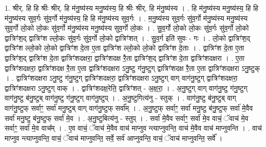 \documentclass[17pt]{extarticle}
\begin{document}
1. श्रीर्. हि हि श्रीः श्रीर्. हि म॑नु॒ष्य॑स्य मनु॒ष्य॑स्य॒ हि श्रीः श्रीर्. हि म॑नु॒ष्य॑स्य । . हि म॑नु॒ष्य॑स्य मनु॒ष्य॑स्य॒ हि हि म॑नु॒ष्य॑स्य सुव॒र्गः सु॑व॒र्गो म॑नु॒ष्य॑स्य॒ हि हि म॑नु॒ष्य॑स्य सुव॒र्गः । . म॒नु॒ष्य॑स्य सुव॒र्गः सु॑व॒र्गो म॑नु॒ष्य॑स्य मनु॒ष्य॑स्य सुव॒र्गो लो॒को लो॒कः सु॑व॒र्गो म॑नु॒ष्य॑स्य मनु॒ष्य॑स्य सुव॒र्गो लो॒कः । . सु॒व॒र्गो लो॒को लो॒कः सु॑व॒र्गः सु॑व॒र्गो लो॒को द्वात्रिꣳ॑श॒द् द्वात्रिꣳ॑श ल्लो॒कः सु॑व॒र्गः सु॑व॒र्गो लो॒को द्वात्रिꣳ॑शत् । . सु॒व॒र्ग इति॑ सुवः - गः । . लो॒को द्वात्रिꣳ॑श॒द् द्वात्रिꣳ॑श ल्लो॒को लो॒को द्वात्रिꣳ॑श दे॒ता ए॒ता द्वात्रिꣳ॑श ल्लो॒को लो॒को द्वात्रिꣳ॑श दे॒ताः । . द्वात्रिꣳ॑श दे॒ता ए॒ता द्वात्रिꣳ॑श॒द् द्वात्रिꣳ॑श दे॒ता द्वात्रिꣳ॑शदक्षरा॒ द्वात्रिꣳ॑शदक्ष रै॒ता द्वात्रिꣳ॑श॒द् द्वात्रिꣳ॑श दे॒ता द्वात्रिꣳ॑शदक्षरा । . ए॒ता द्वात्रिꣳ॑शदक्षरा॒ द्वात्रिꣳ॑शदक्ष रै॒ता ए॒ता द्वात्रिꣳ॑शदक्षरा ऽनु॒ष्टु ग॑नु॒ष्टुग् द्वात्रिꣳ॑शदक्ष रै॒ता ए॒ता द्वात्रिꣳ॑शदक्षरा ऽनु॒ष्टुक् । . द्वात्रिꣳ॑शदक्षरा ऽनु॒ष्टु ग॑नु॒ष्टुग् द्वात्रिꣳ॑शदक्षरा॒ द्वात्रिꣳ॑शदक्षरा ऽनु॒ष्टुग् वाग् वाग॑नु॒ष्टुग् द्वात्रिꣳ॑शदक्षरा॒ द्वात्रिꣳ॑शदक्षरा ऽनु॒ष्टुग् वाक् । . द्वात्रिꣳ॑शदक्ष॒रेति॒ द्वात्रिꣳ॑शत् - अ॒क्ष॒रा॒ । . अ॒नु॒ष्टुग् वाग् वाग॑नु॒ष्टु ग॑नु॒ष्टुग् वाग॑नु॒ष्टु ब॑नु॒ष्टुब् वाग॑नु॒ष्टु ग॑नु॒ष्टुग् वाग॑नु॒ष्टुप् । . अ॒नु॒ष्टुगित्य॑नु - स्तुक् । . वाग॑नु॒ष्टु ब॑नु॒ष्टुब् वाग् वाग॑नु॒ष्टुफ् सर्वाꣳ॒॒ सर्वा॑ मनु॒ष्टुब् वाग् वाग॑नु॒ष्टुफ् सर्वा᳚म् । . अ॒नु॒ष्टुफ् सर्वाꣳ॒॒ सर्वा॑ मनु॒ष्टु ब॑नु॒ष्टुफ् सर्वा॑ मे॒वैव सर्वा॑ मनु॒ष्टु ब॑नु॒ष्टुफ् सर्वा॑ मे॒व । . अ॒नु॒ष्टुबित्य॑नु - स्तुप् । . सर्वा॑ मे॒वैव सर्वाꣳ॒॒ सर्वा॑ मे॒व वाचं॒ ॅवाच॑ मे॒व सर्वाꣳ॒॒ सर्वा॑ मे॒व वाच᳚म् । . ए॒व वाचं॒ ॅवाच॑ मे॒वैव वाच॑ माप्नुव न्त्याप्नुवन्ति॒ वाच॑ मे॒वैव वाच॑ माप्नुवन्ति । . वाच॑ माप्नुव न्त्याप्नुवन्ति॒ वाचं॒ ॅवाच॑ माप्नुवन्ति॒ सर्वे॒ सर्व॑ आप्नुवन्ति॒ वाचं॒ ॅवाच॑ माप्नुवन्ति॒ सर्वे᳚ । \newline
\end{document}
